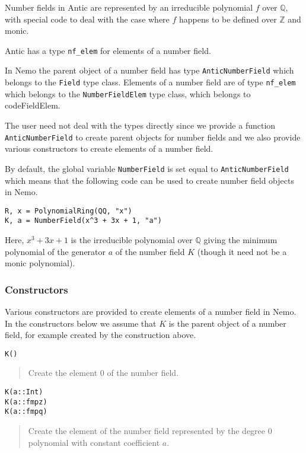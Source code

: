 \documentclass[a4paper,10pt]{article}
\newcommand{\Z}{\mathbb{Z}}
\newcommand{\Q}{\mathbb{Q}}
\newcommand{\code}{\lstinline}
\newcommand{\desc}[1]{\vspace{-3mm}\begin{quote}#1\end{quote}}
\begin{document}
{{Number fields in Antic are represented by an irreducible polynomial $f$ over $\Q$,
with special code to deal with the case where $f$ happens to be defined over $\Z$
and monic.

Antic has a type \code{nf_elem} for elements of a number field.

In Nemo the parent object of a number field has type \code{AnticNumberField} which
belongs to the \code{Field} type class. Elements of a number field are of type
\code{nf_elem} which belongs to the \code{NumberFieldElem} type class, which belongs
to code{FieldElem}.

The user need not deal with the types directly since we provide a function
\code{AnticNumberField} to create parent objects for number fields and we also
provide various constructors to create elements of a number field.

By default, the global variable \code{NumberField} is set equal to
\code{AnticNumberField} which means that the following code can be used to
create number field objects in Nemo.

\begin{lstlisting}
R, x = PolynomialRing(QQ, "x")
K, a = NumberField(x^3 + 3x + 1, "a")
\end{lstlisting}

Here, $x^3 + 3x + 1$ is the irreducible polynomial over $\Q$ giving the minimum
polynomial of the generator $a$ of the number field $K$ (though it need not be
a monic polynomial).

\subsubsection{Constructors}

Various constructors are provided to create elements of a number field in Nemo.
In the constructors below we assume that $K$ is the parent object of a number field,
for example created by the construction above.

\begin{lstlisting}
K()
\end{lstlisting}

\desc{Create the element $0$ of the number field.}

\begin{lstlisting}
K(a::Int)
K(a::fmpz)
K(a::fmpq)
\end{lstlisting}

\desc{Create the element of the number field represented by the degree $0$
polynomial with constant coefficient $a$.}

}}
\end{document}

